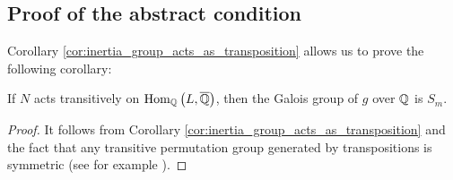 \documentclass[../main.tex]{subfiles}
\begin{document}
\subsection{Proof of the abstract condition}

Corollary \ref{cor:inertia_group_acts_as_transposition} allows us to prove the following corollary:
\begin{corollary}
  \label{cor:transitive_action}
  If $N$ acts transitively on $\operatorname{\rm Hom}_{\mathbb{Q}}\left( L, \overline{\mathbb{Q}} \right)$, then the Galois group of $g$ over $\mathbb{Q}$ is $S_m$.
\end{corollary}
\begin{proof}
  It follows from Corollary \ref{cor:inertia_group_acts_as_transposition} and the fact that any transitive permutation group generated by transpositions is symmetric (see for example \cite[Lemma 5]{Osada1987TheGG}).
\end{proof}
  
\end{document}
